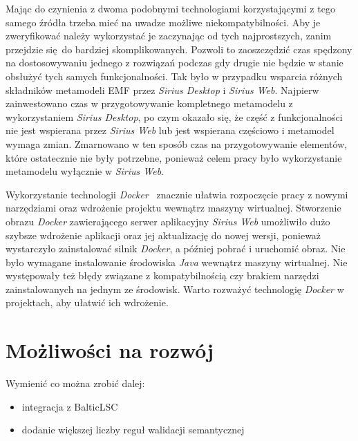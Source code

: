 Mając do czynienia z dwoma podobnymi technologiami korzystającymi z tego samego
źródła trzeba mieć na uwadze możliwe niekompatybilności. Aby je zweryfikować
należy wykorzystać je zaczynając od tych najprostszych, zanim przejdzie się do
bardziej skomplikowanych. Pozwoli to zaoszczędzić czas spędzony na
dostosowywaniu jednego z rozwiązań podczas gdy drugie nie będzie w stanie
obsłużyć tych samych funkcjonalności. Tak było w przypadku wsparcia różnych
składników metamodeli \gls{EMF} przez \emph{Sirius Desktop} i \emph{Sirius
	Web}. Najpierw zainwestowano czas w przygotowywanie kompletnego
metamodelu z
wykorzystaniem \emph{Sirius Desktop}, po czym okazało się, że część z
funkcjonalności nie jest wspierana przez \emph{Sirius Web} lub jest wspierana
częściowo i metamodel wymaga zmian. Zmarnowano w ten sposób czas na
przygotowywanie elementów, które ostatecznie nie były potrzebne, ponieważ celem
pracy było wykorzystanie metamodelu wyłącznie w \emph{Sirius Web}.

Wykorzystanie technologii \emph{Docker}~\cite{wikipedia-docker} znacznie
ułatwia rozpoczęcie pracy z
nowymi narzędziami oraz wdrożenie projektu wewnątrz maszyny wirtualnej.
Stworzenie obrazu \emph{Docker} zawierającego serwer aplikacyjny \emph{Sirius
	Web} umożliwiło dużo szybsze wdrożenie aplikacji oraz jej aktualizację
do nowej
wersji, ponieważ wystarczyło zainstalować silnik \emph{Docker}, a później
pobrać i uruchomić obraz. Nie było wymagane instalowanie środowiska \emph{Java}
wewnątrz maszyny wirtualnej. Nie występowały też błędy związane z
kompatybilnością czy brakiem narzędzi zainstalowanych na jednym ze środowisk.
Warto rozważyć technologię \emph{Docker} w projektach, aby ułatwić ich
wdrożenie.

\section{Możliwości na rozwój}

Wymienić co można zrobić dalej:

\begin{itemize}
	\item integracja z BalticLSC
	\item dodanie większej liczby reguł walidacji semantycznej
\end{itemize}
